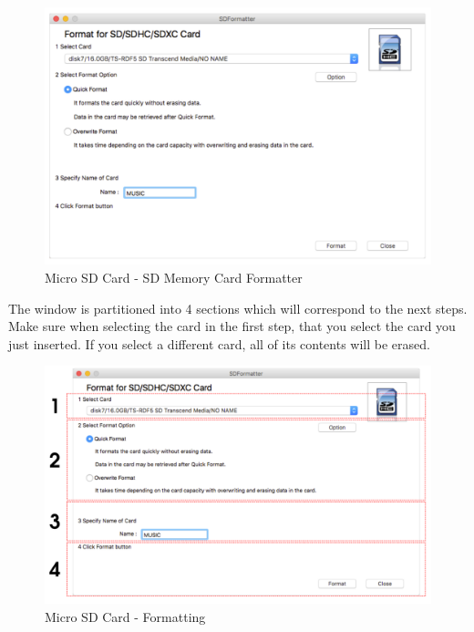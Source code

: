 \begin{figure}[H]
\centering
  \includegraphics{images/sd_formatter.png}
\caption{Micro SD Card - SD Memory Card Formatter}
\end{figure}

The window is partitioned into \num{4} sections which will correspond to the
next steps.  Make sure when selecting the card in the first step, that you
select the card you just inserted.  If you select a different card, all of
its contents will be erased.


\begin{figure}[H]
\centering
  \includegraphics{images/sd_formatter_steps.png}
\caption{Micro SD Card - Formatting}
\end{figure}

